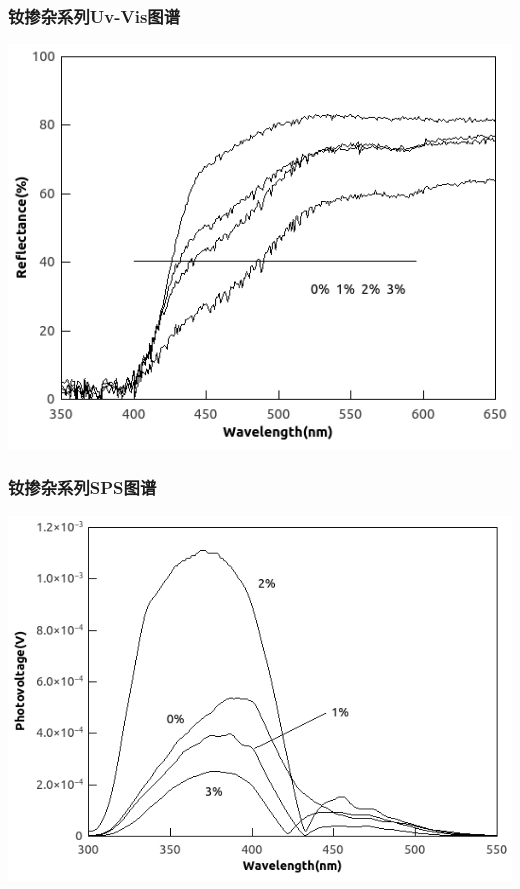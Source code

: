 \documentclass[xetex,compress]{mybeamer}
\begin{document}
\begin{frame}
\frametitle{钕掺杂系列Uv-Vis图谱}
\begin{block}{}
\centering
\includegraphics[scale=7]{figures/钕掺杂UV.jpg} 
\end{block}
\end{frame}


\begin{frame}
\frametitle{钕掺杂系列SPS图谱}
\begin{block}{}
\centering
\includegraphics[scale=7]{figures/钕掺杂SPS.jpg} 
\end{block}
\end{frame}
\end{document}
